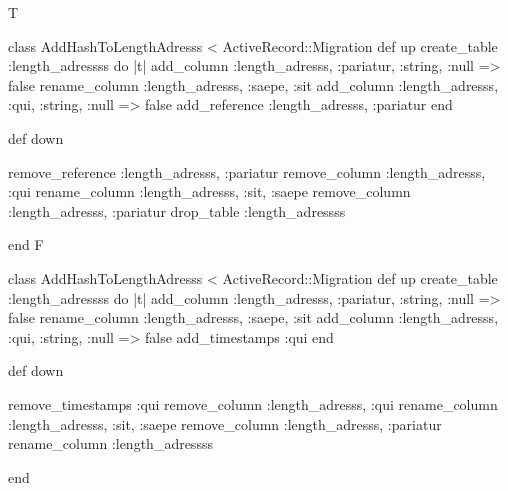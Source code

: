 T
	 
class AddHashToLengthAdresss < ActiveRecord::Migration
  	def up
	     create_table :length_adressss do |t|
       		add_column :length_adresss, :pariatur, :string, :null => false
		rename_column :length_adresss, :saepe, :sit
		add_column :length_adresss, :qui, :string, :null => false
       		add_reference :length_adresss, :pariatur
    	end

  	def down

    		remove_reference :length_adresss, :pariatur
    		remove_column :length_adresss, :qui
		rename_column :length_adresss, :sit, :saepe
		remove_column :length_adresss, :pariatur
    	drop_table :length_adressss
    
	end
F
	 
class AddHashToLengthAdresss < ActiveRecord::Migration
  	def up
	     create_table :length_adressss do |t|
       		add_column :length_adresss, :pariatur, :string, :null => false
		rename_column :length_adresss, :saepe, :sit
		add_column :length_adresss, :qui, :string, :null => false
       		add_timestamps :qui
    	end

  	def down

    		remove_timestamps :qui
    		remove_column :length_adresss, :qui
		rename_column :length_adresss, :sit, :saepe
		remove_column :length_adresss, :pariatur
    	rename_column :length_adressss
    
	end
